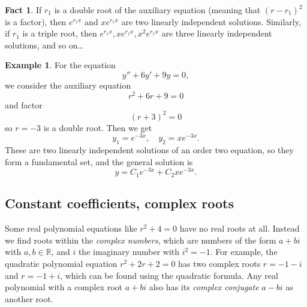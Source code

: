 \documentclass[12pt]{amsart}
\numberwithin{equation}{section}
\theoremstyle{plain} %
\theoremstyle{definition}
\newtheorem{ex}[equation]{Example}
\newtheorem{fact}[equation]{Fact}
\theoremstyle{remark}
\newcommand{\R}{\mathbb{R}}
\begin{document}
\begin{fact} If $r_1$ is a double root of the auxiliary equation (meaning that $(r-r_1)^2$ is a factor), then $e^{r_1 x}$ and $x e^{r_1 x}$ are two linearly independent solutions. Similarly, if $r_1$ is a triple root, then $e^{r_1 x},x e^{r_1 x}, x^2 e^{r_1 x}$ are three linearly independent solutions, and so on\dots
\end{fact}

\begin{ex}
For the equation
\[ y'' + 6y' +9y = 0,\]
we consider the auxiliary equation
\[ r^2 + 6r +9=0\]
and factor
\[ (r+3)^2=0\]
so $r=-3$ is a double root.
Then we get 
\[ y_1= e^{-3x}, \quad y_2= xe^{-3x}.\]
These are two linearly independent solutions of an order two equation, so they form a fundamental set,
and the general solution is
\[ y = C_1 e^{-3x} +C_2 xe^{-3x}.\]
\end{ex}

\subsection*{Constant coefficients, complex roots}

Some real polynomial equations like $r^2+4=0$ have no real roots at all. Instead we find roots within the \emph{complex numbers}, which are numbers of the form $a+bi$ with $a,b\in \R$, and $i$ the imaginary number with $i^2=-1$. For example, the quadratic polynomial equation $r^2 + 2r + 2 = 0$ has two complex roots $r=-1-i$ and $r=-1+i$, which can be found using the quadratic formula. Any real polynomial with a complex root $a+bi$ also has its \emph{complex conjugate} $a-bi$ as another root.
\end{document}
